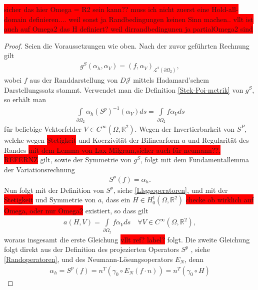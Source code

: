 \colorbox{red}{ sicher das hier Omega = R2 sein kann?? muss ich nicht zuerst eine Hold-all-domain definieren.... weil sonst ja Randbedingungen keinen Sinn machen.. vllt ist auch auf Omega2 das H definiert? weil dirrandbedingunen ja partialOmega2 sind}

\begin{proof}
Seien die Voraussetzungen wie oben. Nach der zuvor geführten Rechnung gilt
\begin{align*}
	g^S(\alpha_h, \alpha_V) = (f,\alpha_V)_{\mathcal{L}^2(\partial\Omega_2)},
\end{align*}
wobei $f$ aus der Randdarstellung von $D\mathcal{J}$ mittels Hadamard'schem Darstellungssatz stammt. Verwendet man die Definition \ref{Stek-Poi-metrik} von $g^S$, so erhält man
\begin{align*}
	\underset{\partial\Omega_2}{\int} \alpha_h (S^p)^{-1}(\alpha_V)ds = 				\underset{\partial\Omega_2}{\int} f \alpha_V ds
\end{align*}
für beliebige Vektorfelder $V\in C^\infty(\Omega, \mathbb{R}^2)$. Wegen der Invertierbarkeit von $S^P$, welche wegen \colorbox{red}{Stetigkeit} und Koerzivität der Bilinearform $a$ und Regularität des Randes \colorbox{red}{ mit dem Lemma von Lax-Milgram,sicher auch für neumann??, REFERNZ} gilt, sowie der Symmetrie von $g^S$, folgt mit dem Fundamentallemma der Variationsrechnung
\begin{align*}
	S^p(f) = \alpha_h.
\end{align*}
Nun folgt mit der Definition von $S^p$, siehe \ref{Llsgsoperatoren}, und mit der \colorbox{red}{Stetigkeit} und Symmetrie von $a$, dass ein $H \in H^1_0(\Omega,\mathbb{R}^2)$ \colorbox{red}{checke ob wirklich auf Omega, oder nur Omega2} existiert, so dass gilt
\begin{align*}
	a(H,V) = \underset{\partial\Omega_2}{\int} f \alpha_V ds \quad \forall V\in C^\infty(\Omega,\mathbb{R}^2),
\end{align*}
woraus insgesamt die erste Gleichung \colorbox{red}{vllt ref? label?} folgt. Die zweite Gleichung folgt direkt aus der Definition des projezierten Operators $S^p$ , siehe \ref{Randoperatoren}, und des Neumann-Lösungsoperators $E_N$, denn
\begin{align*}
	\alpha_h = S^p(f) = n^T(\gamma_0\circ E_N(f\cdot n)) = n^T(\gamma_0 \circ H)
\end{align*}
\end{proof}

